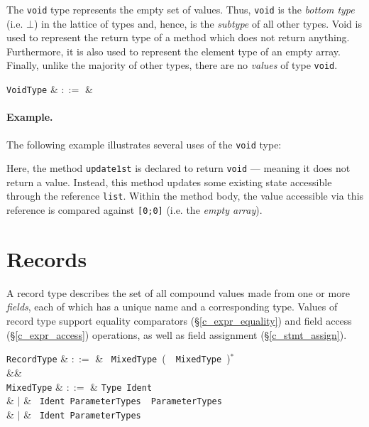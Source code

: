 The \lstinline{void} type represents the empty set of values.  Thus, \lstinline{void} is the {\em bottom type} (i.e. $\bot$) in the lattice of types and, hence, is the {\em subtype} of all other types.  Void is used to represent the return type of a method which does not return anything.  Furthermore, it is also used to represent the element type of an empty array.  Finally, unlike the majority of other types, there are no {\em values} of type \lstinline{void}.

\begin{syntax}
   \verb+VoidType+ & $::=$ &  \\
\end{syntax}

\paragraph{Example.} The following example illustrates several uses of the \lstinline{void} type:



Here, the method \lstinline{update1st} is declared to return \lstinline{void} --- meaning it does not return a value.  Instead, this method updates some existing state accessible through the reference \lstinline{list}.  Within the method body, the value accessible via this reference is compared against \lstinline{[0;0]} (i.e. the {\em empty array}).


\section{Records}
\label{c_types_record}

A record type describes the set of all compound values made from one or more {\em fields}, each of which has a unique name and a corresponding type.  Values of record type support equality comparators (\S\ref{c_expr_equality}) and field access (\S\ref{c_expr_access}) operations, as well as field assignment (\S\ref{c_stmt_assign}).

\begin{syntax}
  \verb+RecordType+ & $::=$ & \token{\{}\ \verb+MixedType+\ \big(\ \token{,}\ \verb+MixedType+\ \big)$^*$ \ \token{\}}\\
  &&\\
  \verb+MixedType+ & $::=$ & \verb+Type+\ \verb+Ident+\\
                       &  $|$  & \ \verb+Ident+\ \verb+ParameterTypes+\ \token{->}\ \verb+ParameterTypes+\\
                       &  $|$  & \ \verb+Ident+\ \verb+ParameterTypes+\ \\
\end{syntax}


